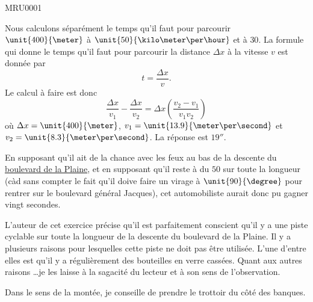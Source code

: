 \documentclass{article}
\begin{document}

\begin{corrige}{MRU0001}

	Nous calculons séparément le temps qu'il faut pour parcourir $\unit{400}{\meter}$ à $\unit{50}{\kilo\meter\per\hour}$ et à $30$. La formule qui donne le temps qu'il faut pour parcourir la distance $\Delta x$ à la vitesse $v$ est donnée par
	\begin{equation}
		t = \frac{ \Delta x }{ v }.
	\end{equation}
	Le calcul à faire est donc
	\begin{equation}
		\frac{ \Delta x }{ v_1 }-\frac{ \Delta x }{ v_2 }=\Delta x\left( \frac{ v_2-v_1 }{ v_1v_2 } \right)
	\end{equation}
	où $\Delta x=\unit{400}{\meter}$, $v_1=\unit{13.9}{\meter\per\second}$ et $v_2=\unit{8.3}{\meter\per\second}$. La réponse est $\unit{19}{\second}$.

	En supposant qu'il ait de la chance avec les feux au bas de la descente du \href{http://www.openstreetmap.org/?lat=50.82012&lon=4.38813&zoom=15&layers=B000FTF}{boulevard de la Plaine}, et en supposant qu'il reste à du $50$ sur toute la longueur (càd sans compter le fait qu'il doive faire un virage à $\unit{90}{\degree}$ pour rentrer sur le boulevard général Jacques), cet automobiliste aurait donc pu gagner vingt secondes.

\end{corrige}

\begin{remark}
	L'auteur de cet exercice précise qu'il est parfaitement conscient qu'il y a une piste cyclable sur toute la longueur de la descente du boulevard de la Plaine. Il y a plusieurs raisons pour lesquelles cette piste ne doit pas être utilisée. L'une d'entre elles est qu'il y a régulièrement des bouteilles en verre cassées. Quant aux autres raisons \ldots je les laisse à la sagacité du lecteur et à son sens de l'observation.

	Dans le sens de la montée, je conseille de prendre le trottoir du côté des banques.
\end{remark}


\end{document}
